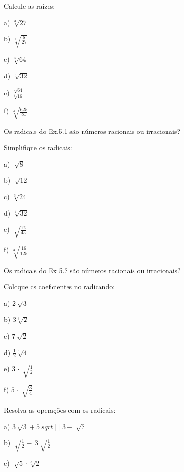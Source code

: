\begin{exercicios}
	
	\exitem{} Calcule as raízes:

\begin{multicols}{6}
	
	a) \( \sqrt[3]{27} \)
	
	b)  \( \sqrt[3]{\frac{8}{27}} \)
	
	c)  \( \sqrt[3]{64} \)
	
	d)  \( \sqrt[5]{32} \)
	
	e)  \( \frac{\sqrt[]{64}}{\sqrt[4]{16}} \)
	
	f)  \( \sqrt[4]{\frac{625}{81}} \) 
\end{multicols}

	\exitem{} Os radicais do Ex.5.1 são números racionais ou irracionais?

	\exitem{} Simplifique os radicais:
	\begin{multicols}{6}

		 a) \(\sqrt[]{8} \)
		 
		 b)  \( \sqrt[]{12} \)
		 
		 c)  \( \sqrt[3]{24} \)
		 
		 d)  \( \sqrt[4]{32} \) 
		 
		 e)  \( \sqrt[]{\frac{12}{45}} \)
		 
		 f)  \( \sqrt[3]{\frac{16}{125}} \)
	\end{multicols}
	\exitem{} Os radicais do Ex 5.3 são números racionais ou irracionais?

	\exitem{} Coloque os coeficientes no radicando:
	\begin{multicols}{6}
		
	
	a) \( 2 \sqrt[]{3} \)
	
	b)  \( 3 \sqrt[3]{2} \)
	
	c)  \( 7 \sqrt[]{2} \)
	
	d)  \( \frac{1}{2}\sqrt[3]{4} \)
	
	e)  \( 3~ \cdot   \sqrt[]{\frac{1}{2}} \)
	
	f)  \( 5~ \cdot   \sqrt[]{\frac{3}{4}} \) 
	\end{multicols}
	\exitem{} Resolva as operações com os radicais:
	\begin{multicols}{4}
		a)  \( 3 \sqrt[]{3}+5\ sqrt[]{3}-\sqrt[]{3} \) ~ \quad ~~~ 
		
		b)  \( \sqrt[]{\frac{1}{2}}-~3  \sqrt[]{\frac{1}{2}} \)
		
		c)  \( \sqrt[]{5}  \cdot  \sqrt[3]{2} \)
		

\end{multicols}
\end{exercicios}
